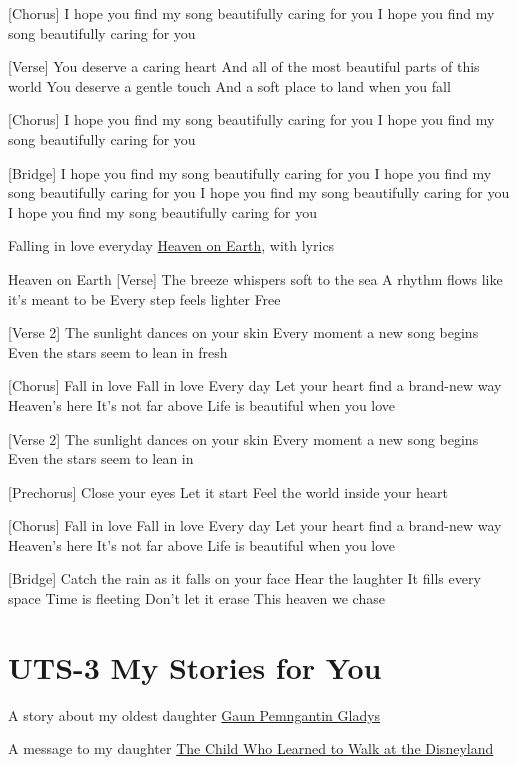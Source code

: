 \documentclass[
  letterpaper,
  DIV=11,
  numbers=noendperiod]{scrreprt}
\begin{document}
{[}Chorus{]} I hope you find my song beautifully caring for you I hope
you find my song beautifully caring for you

{[}Verse{]} You deserve a caring heart And all of the most beautiful
parts of this world You deserve a gentle touch And a soft place to land
when you fall

{[}Chorus{]} I hope you find my song beautifully caring for you I hope
you find my song beautifully caring for you

{[}Bridge{]} I hope you find my song beautifully caring for you I hope
you find my song beautifully caring for you I hope you find my song
beautifully caring for you I hope you find my song beautifully caring
for you

Falling in love everyday \href{./Heaven\%20on\%20Earth.mp3}{Heaven on
Earth}, with lyrics

Heaven on Earth {[}Verse{]} The breeze whispers soft to the sea A rhythm
flows like it's meant to be Every step feels lighter Free

{[}Verse 2{]} The sunlight dances on your skin Every moment a new song
begins Even the stars seem to lean in fresh

{[}Chorus{]} Fall in love Fall in love Every day Let your heart find a
brand-new way Heaven's here It's not far above Life is beautiful when
you love

{[}Verse 2{]} The sunlight dances on your skin Every moment a new song
begins Even the stars seem to lean in

{[}Prechorus{]} Close your eyes Let it start Feel the world inside your
heart

{[}Chorus{]} Fall in love Fall in love Every day Let your heart find a
brand-new way Heaven's here It's not far above Life is beautiful when
you love

{[}Bridge{]} Catch the rain as it falls on your face Hear the laughter
It fills every space Time is fleeting Don't let it erase This heaven we
chase


\chapter{UTS-3 My Stories for You}\label{uts-3-my-stories-for-you}

A story about my oldest daughter
\href{https://azrl.wordpress.com/2020/07/18/gaun-pengantin-gladys/\#comment-28004}{Gaun
Pemngantin Gladys}

A message to my daughter
\href{https://azrl.wordpress.com/2021/10/06/the-child-who-learned-to-walk-at-the-disneyland/}{The
Child Who Learned to Walk at the Disneyland}
\end{document}
